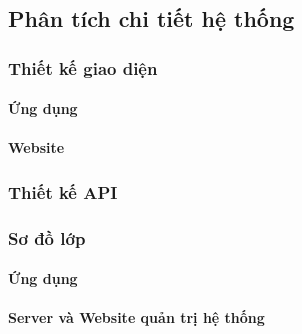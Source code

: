 \subsection{Phân tích chi tiết hệ thống}

\subsubsection{Thiết kế giao diện}

\paragraph{Ứng dụng}
\mbox{}

\paragraph{Website}
\mbox{}

\subsubsection{Thiết kế API}


\subsubsection{Sơ đồ lớp}

\paragraph{Ứng dụng}
\mbox{}

\paragraph{Server và Website quản trị hệ thống}
\mbox{}

